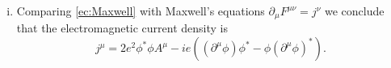 \documentclass{article}
\begin{document}
\begin{enumerate}
\begin{enumerate}[(i)]
\item Comparing \eqref{ec:Maxwell} with Maxwell's equations $\partial_\mu F^{\mu\nu}=j^\nu$ we conclude that the electromagnetic current density is
\begin{equation}
j^\mu=2e^2\phi^*\phi A^\mu-ie((\partial^\mu\phi)\phi^*-\phi(\partial^\mu\phi)^*).
\end{equation}

\end{enumerate}

\end{enumerate}
\end{document}
